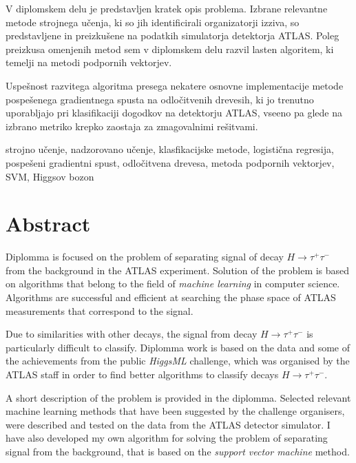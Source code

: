 V diplomskem delu je predstavljen kratek opis problema. Izbrane relevantne metode strojnega učenja, ki so jih identificirali organizatorji izziva, so predstavljene in preizkušene na podatkih simulatorja detektorja ATLAS. Poleg preizkusa omenjenih metod sem v diplomskem delu razvil lasten algoritem, ki temelji na metodi podpornih vektorjev.

Uspešnost razvitega algoritma presega nekatere osnovne implementacije metode pospešenega gradientnega spusta na odločitvenih drevesih, ki jo trenutno uporabljajo pri klasifikaciji dogodkov na detektorju ATLAS, vseeno pa glede na izbrano metriko krepko zaostaja za zmagovalnimi rešitvami.


\vspace{1.3cm}


\vspace{0.1cm}
\noindent strojno učenje, nadzorovano učenje, klasfikacijske metode, logistična regresija, pospešeni gradientni spust, odločitvena drevesa, metoda podpornih vektorjev, SVM, Higgsov bozon

\chapter*{Abstract}
\vspace{1.3cm}
\noindent Diplomma is focused on the problem of separating signal of decay $H \rightarrow \tau^+\tau^-$  from the background in the ATLAS experiment. Solution of the problem is based on algorithms that belong to the field of \textit{machine learning} in  computer science. Algorithms are successful and efficient at searching the phase space of ATLAS measurements that correspond to the signal.

Due to similarities with other decays, the signal from decay $H \rightarrow \tau^+\tau^-$ is particularly difficult to classify. Diplomma work is based on the data and some of the achievements from the public \textit{HiggsML} challenge, which was organised by the ATLAS staff in order to find better algorithms to classify decays $H \rightarrow \tau^+\tau^-$.

A short description of the problem is provided in the diplomma. Selected relevant machine learning methods that have been suggested by the challenge organisers, were described and tested on the data from the ATLAS detector simulator. I have also developed my own algorithm for solving the problem of separating signal from the background, that is based on the \textit{support vector machine} method.

